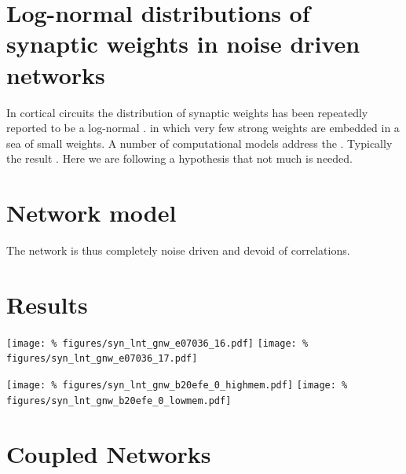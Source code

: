 \columnbreak
\section*{\LARGE Log-normal distributions of synaptic weights in noise driven networks}

In cortical circuits the distribution of synaptic weights has been repeatedly reported to be a log-normal \cite{Song2005}. in which very few strong weights are embedded in a sea of small weights. A number of computational models address the . Typically the result . Here we are following a hypothesis that not much is needed.


\section*{Network model}

The network is thus completely noise driven and devoid of correlations.



\section*{Results}

\begin{center}\vspace{1cm}
  \texttt{[image: \%
    figures/syn\_lnt\_gnw\_e07036\_16.pdf]}
  \texttt{[image: \%
    figures/syn\_lnt\_gnw\_e07036\_17.pdf]}

\end{center}\vspace{1cm}


\begin{center}\vspace{1cm}
  \texttt{[image: \%
    figures/syn\_lnt\_gnw\_b20efe\_0\_highmem.pdf]}
  \texttt{[image: \%
    figures/syn\_lnt\_gnw\_b20efe\_0\_lowmem.pdf]}

\end{center}\vspace{1cm}


\section*{Coupled Networks}

